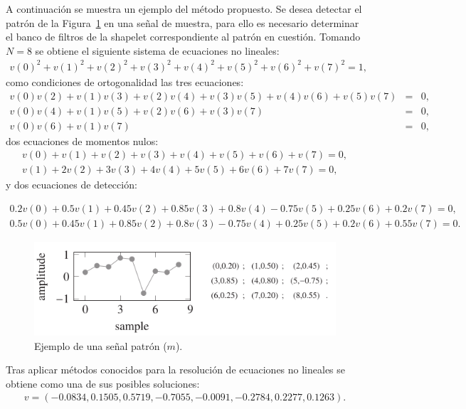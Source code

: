 \par A continuaci\'on se muestra un ejemplo del m\'etodo propuesto. Se desea detectar el patr\'on de la Figura~\ref{patron-unidimensional} en una se\~nal de muestra, para ello es necesario determinar el banco de filtros de la shapelet correspondiente al patr\'on en cuesti\'on. Tomando $N=8$ se obtiene el siguiente sistema de ecuaciones no lineales:
\begin{eqnarray}
v(0)^2+v(1)^2+v(2)^2+v(3)^2+v(4)^2+v(5)^2+v(6)^2+v(7)^2=1,\nonumber
\end{eqnarray}
como condiciones de ortogonalidad las tres ecuaciones:
\begin{eqnarray}
v(0)v(2)+v(1)v(3)+v(2)v(4)+v(3)v(5)+v(4)v(6)+v(5)v(7)&=&0,\nonumber\\
v(0)v(4)+v(1)v(5)+v(2)v(6)+v(3)v(7)&=&0,\nonumber\\
v(0)v(6)+v(1)v(7)&=&0,\nonumber
\end{eqnarray}
dos ecuaciones de momentos nulos:
\begin{eqnarray}
v(0)+v(1)+v(2)+v(3)+v(4)+v(5)+v(6)+v(7)=0,\nonumber\\
v(1)+2v(2)+3v(3)+4v(4)+5v(5)+6v(6)+7v(7)=0,\nonumber
\end{eqnarray}
y dos ecuaciones de detecci\'on:
\begin{small}
\begin{eqnarray}
0.2v(0)+0.5v(1)+0.45v(2)+0.85v(3)+0.8v(4)-0.75v(5)+0.25v(6)+0.2v(7)=0,\nonumber\\
0.5v(0)+0.45v(1)+0.85v(2)+0.8v(3)-0.75v(4)+0.25v(5)+0.2v(6)+0.55v(7)=0.\nonumber
\end{eqnarray}
\end{small}

\begin{figure}[h]
\center
\includegraphics[scale=.5]{Graphics/Patron.png}
\caption{Ejemplo de una se\~nal patr\'on ($m$).}
\label{patron-unidimensional}
\end{figure}

\par Tras aplicar m\'etodos conocidos para la resoluci\'on de ecuaciones no lineales se obtiene como una de sus posibles soluciones:
\begin{eqnarray}
v = (-0.0834,0.1505,0.5719,-0.7055,-0.0091,-0.2784,0.2277,0.1263).\nonumber
\end{eqnarray}

